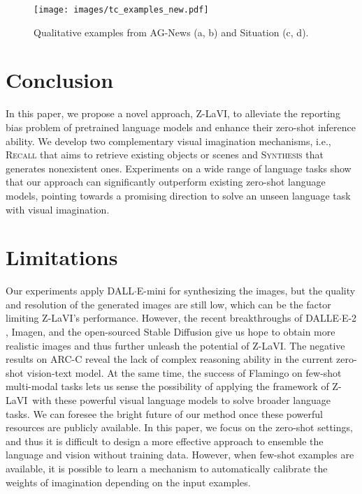 \documentclass[11pt]{article}
\newcommand{\model}{Z-LaVI}
\begin{document}
\begin{figure}[!t]
\centering
    \texttt{[image: images/tc\_examples\_new.pdf]}
    \caption{Qualitative examples from AG-News (a, b) and Situation (c, d).}
    \label{fig:tc examples}
    \vspace{-.15cm}
\end{figure}

\vspace{-.1cm}
\section{Conclusion}
\vspace{-.1cm}
In this paper, we propose a novel approach, Z-LaVI, to alleviate the reporting bias problem of pretrained language models and enhance their zero-shot inference ability. We develop two complementary visual imagination mechanisms, i.e., \textsc{Recall} that aims to retrieve existing objects or scenes and \textsc{Synthesis} that generates nonexistent ones. Experiments on a wide range of language tasks show that our approach can significantly outperform existing zero-shot language models, pointing towards a promising direction to solve an unseen language task with visual imagination.

\section{Limitations}
Our experiments apply DALL$\cdot$E-mini for synthesizing the images, but the quality and resolution of the generated images are still low, which can be the factor limiting \model's performance. However, the recent breakthroughs of DALLE$\cdot$E-2 \cite{ramesh2022hierarchical}, Imagen, \cite{saharia2022photorealistic} and the open-sourced Stable Diffusion \cite{rombach2022high} give us hope to obtain more realistic images and thus further unleash the potential of \model. The negative results on ARC-C reveal the lack of complex reasoning ability in the current zero-shot vision-text model. At the same time, the success of Flamingo \cite{alayrac2022flamingo} on few-shot multi-modal tasks lets us sense the possibility of applying the framework of \model~with these powerful visual language models to solve broader language tasks. We can foresee the bright future of our method once these powerful resources are publicly available. In this paper, we focus on the zero-shot settings, and thus it is difficult to design a more effective approach to ensemble the language and vision without training data. However, when few-shot examples are available, it is possible to learn a mechanism to automatically calibrate the weights of imagination depending on the input examples.
\end{document}
